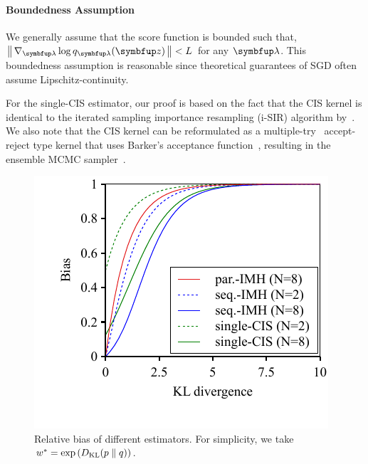 \vspace{-0.05in}
\paragraph{Boundedness Assumption}
We generally assume that the score function is bounded such that, \(\norm{\nabla_{\vlambda} \log q_{\vlambda}(\vz)} < L\) for any \(\vlambda\).
This boundedness assumption is reasonable since theoretical guarantees of SGD often assume Lipschitz-continuity.%

%

%

%
For the single-CIS estimator, our proof is based on the fact that the CIS kernel is identical to the iterated sampling importance resampling (i-SIR) algorithm by~\citet{andrieu_uniform_2018}.
We also note that the CIS kernel can be reformulated as a multiple-try~\citet[Table 12]{martino_review_2018a} accept-reject type kernel that uses Barker's acceptance function~\citep{barker_monte_1965}, resulting in the ensemble MCMC sampler~\citet{austad_parallel_2007, neal_mcmc_2011a}.
%

%
\begin{figure}[H]
\vspace{-0.05in}
  \centering
  \includegraphics[scale=0.8]{figures/bias_01.pdf}
  \vspace{-0.3in}
  \caption{Relative bias of different estimators.
  For simplicity, we take \(w^* = \exp\left( D_{\mathrm{KL}}(p\parallel q) \right)\).}\label{fig:bias}
\vspace{-0.05in}
\end{figure}
%
\vspace{-0.05in}
